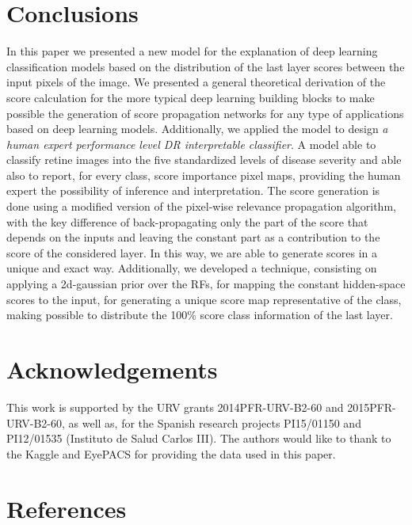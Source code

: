 \documentclass[preprint]{elsarticle}
\theoremstyle{definition} %
\theoremstyle{remark}
\begin{document}
\section{Conclusions}\label{sec:conclusions}

In this paper we presented a new model for the explanation of deep learning classification models based on the distribution of the last layer scores between the input pixels of the image. We presented a general theoretical derivation of the score calculation for the more typical deep learning building blocks to make possible the generation of score propagation networks for any type of applications based on deep learning models.  Additionally, we applied the model to design \emph{a human expert performance level DR interpretable classifier}. A model able to classify retine images into the five standardized levels of disease severity and able also to report, for every class, score importance pixel maps, providing the human expert the possibility of inference and interpretation. The score generation is done using a modified version of the pixel-wise relevance propagation algorithm, with the key difference of back-propagating only the part of the score that depends on the inputs and leaving the constant part as a contribution to the score of the considered layer. In this way, we are able to generate scores in a unique and exact way. Additionally, we developed a technique, consisting on applying a 2d-gaussian prior over the RFs, for mapping the constant hidden-space scores to the input, for generating a unique score map representative of the class, making possible to distribute the 100\% score class information of the last layer. 

\section*{Acknowledgements}
This work is supported by the URV grants 2014PFR-URV-B2-60 and 2015PFR-URV-B2-60, as well as, for the Spanish research projects PI15/01150 and PI12/01535 (Instituto de Salud Carlos III). The authors would like to thank to the Kaggle and EyePACS for providing the data used in this paper.

\section*{References}


\end{document}
